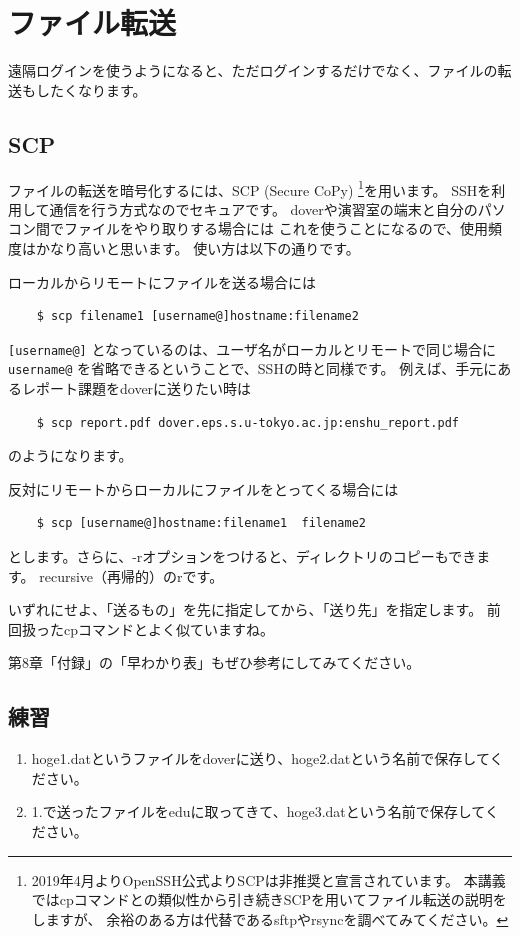 \documentclass[a4j]{ltjreport}
\begin{document}
    \section{ファイル転送}
    遠隔ログインを使うようになると、ただログインするだけでなく、ファイルの転送もしたくなります。

    \subsection{SCP}
    ファイルの転送を暗号化するには、SCP (Secure CoPy)
    \footnote{2019年4月よりOpenSSH公式よりSCPは非推奨と宣言されています。
    本講義ではcpコマンドとの類似性から引き続きSCPを用いてファイル転送の説明をしますが、
    余裕のある方は代替であるsftpやrsyncを調べてみてください。}を用います。
    SSHを利用して通信を行う方式なのでセキュアです。
    doverや演習室の端末と自分のパソコン間でファイルをやり取りする場合には
    これを使うことになるので、使用頻度はかなり高いと思います。
    使い方は以下の通りです。

    ローカルからリモートにファイルを送る場合には
    \begin{verbatim}
    $ scp filename1 [username@]hostname:filename2
    \end{verbatim}
    \verb|[username@]| となっているのは、ユーザ名がローカルとリモートで同じ場合に
    \verb|username@| を省略できるということで、SSHの時と同様です。
    例えば、手元にあるレポート課題をdoverに送りたい時は
    \begin{verbatim}
    $ scp report.pdf dover.eps.s.u-tokyo.ac.jp:enshu_report.pdf
    \end{verbatim}
    のようになります。

    反対にリモートからローカルにファイルをとってくる場合には
    \begin{verbatim}
    $ scp [username@]hostname:filename1  filename2
    \end{verbatim}
    とします。さらに、-rオプションをつけると、ディレクトリのコピーもできます。
    recursive（再帰的）のrです。 

    いずれにせよ、「送るもの」を先に指定してから、「送り先」を指定します。
    前回扱ったcpコマンドとよく似ていますね。

    第8章「付録」の「早わかり表」もぜひ参考にしてみてください。

    \vspace{1em}

    \subsection{練習}
    \begin{enumerate}
        \item hoge1.datというファイルをdoverに送り、hoge2.datという名前で保存してください。
        \item 1.で送ったファイルをeduに取ってきて、hoge3.datという名前で保存してください。
    \end{enumerate}
\end{document}
